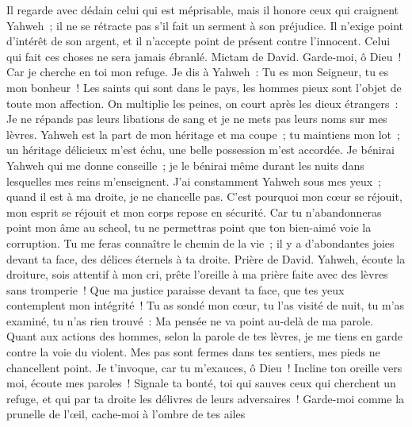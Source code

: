 \begin{multicols}{2}
Il regarde avec dédain celui qui est méprisable, mais il honore ceux qui craignent Yahweh~; il ne se rétracte pas s'il fait un serment à son préjudice.
Il n'exige point d'intérêt de son argent, et il n'accepte point de présent contre l'innocent. Celui qui fait ces choses ne sera jamais ébranlé.
\VerseOne{}Mictam de David. Garde-moi, ô Dieu~! Car je cherche en toi mon refuge.
Je dis à Yahweh~: Tu es mon Seigneur, tu es mon bonheur~!
Les saints qui sont dans le pays, les hommes pieux sont l'objet de toute mon affection.
On multiplie les peines, on court après les dieux étrangers~: Je ne répands pas leurs libations de sang et je ne mets pas leurs noms sur mes lèvres.
Yahweh est la part de mon héritage et ma coupe~; tu maintiens mon lot~;
un héritage délicieux m'est échu, une belle possession m'est accordée.
Je bénirai Yahweh qui me donne conseille~; je le bénirai même durant les nuits dans lesquelles mes reins m'enseignent.
J'ai constamment Yahweh sous mes yeux~; quand il est à ma droite, je ne chancelle pas.
C'est pourquoi mon cœur se réjouit, mon esprit se réjouit et mon corps repose en sécurité.
Car tu n'abandonneras point mon âme au scheol, tu ne permettras point que ton bien-aimé voie la corruption.
Tu me feras connaître le chemin de la vie~; il y a d'abondantes joies devant ta face, des délices éternels à ta droite.
\VerseOne{}Prière de David. Yahweh, écoute la droiture, sois attentif à mon cri, prête l'oreille à ma prière faite avec des lèvres sans tromperie~!
Que ma justice paraisse devant ta face, que tes yeux contemplent mon intégrité~!
Tu as sondé mon cœur, tu l'as visité de nuit, tu m'as examiné, tu n'as rien trouvé~: Ma pensée ne va point au-delà de ma parole.
Quant aux actions des hommes, selon la parole de tes lèvres, je me tiens en garde contre la voie du violent.
Mes pas sont fermes dans tes sentiers, mes pieds ne chancellent point.
Je t'invoque, car tu m'exauces, ô Dieu~! Incline ton oreille vers moi, écoute mes paroles~!
Signale ta bonté, toi qui sauves ceux qui cherchent un refuge, et qui par ta droite les délivres de leurs adversaires~!
Garde-moi comme la prunelle de l'œil, cache-moi à l'ombre de tes ailes

\end{multicols}
